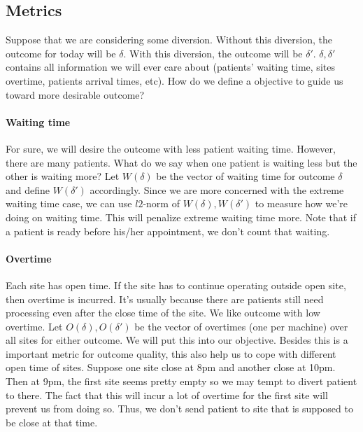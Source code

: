 \subsection{Metrics}

Suppose that we are considering some diversion. Without this diversion, the outcome for today will be $\delta$. With this diversion, the outcome will be $\delta'$. $\delta, \delta'$ contains all information we will ever care about (patients' waiting time, sites overtime, patients arrival times, etc). How do we define a objective to guide us toward more desirable outcome?

\paragraph{Waiting time} For sure, we will desire the outcome with less patient waiting time. However, there are many patients. What do we say when one patient is waiting less but the other is waiting more? Let $W(\delta)$ be the vector of waiting time for outcome $\delta$ and define $W(\delta')$ accordingly. Since we are more concerned with the extreme waiting time case, we can use $l2$-norm of $W(\delta), W(\delta')$ to measure how we're doing on waiting time. This will penalize extreme waiting time more. Note that if a patient is ready before his/her appointment, we don't count that waiting.

\paragraph{Overtime} Each site has open time. If the site has to continue operating outside open site, then overtime is incurred. It's usually because there are patients still need processing even after the close time of the site. We like outcome with low overtime. Let $O(\delta), O(\delta')$ be the vector of overtimes (one per machine) over all sites for either outcome. We will put this into our objective. Besides this is a important metric for outcome quality, this also help us to cope with different open time of sites. Suppose one site close at 8pm and another close at 10pm. Then at 9pm, the first site seems pretty empty so we may tempt to divert patient to there. The fact that this will incur a lot of overtime for the first site will prevent us from doing so. Thus, we don't send patient to site that is supposed to be close at that time.

